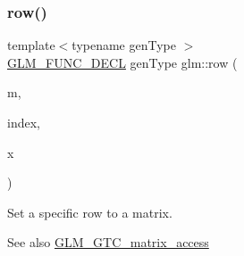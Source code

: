 \subsubsection{\texorpdfstring{row()}{row()}\hspace{0.1cm}{\footnotesize\ttfamily [2/2]}}
{\footnotesize\ttfamily template$<$typename gen\+Type $>$ \\
\hyperlink{setup_8hpp_ab2d052de21a70539923e9bcbf6e83a51}{G\+L\+M\+\_\+\+F\+U\+N\+C\+\_\+\+D\+E\+CL} gen\+Type glm\+::row (\begin{DoxyParamCaption}\item[{gen\+Type const \&}]{m,  }\item[{\hyperlink{namespaceglm_a090a0de2260835bee80e71a702492ed9}{length\+\_\+t}}]{index,  }\item[{typename gen\+Type\+::row\+\_\+type const \&}]{x }\end{DoxyParamCaption})}

Set a specific row to a matrix. \begin{DoxySeeAlso}{See also}
\hyperlink{group__gtc__matrix__access}{G\+L\+M\+\_\+\+G\+T\+C\+\_\+matrix\+\_\+access} 
\end{DoxySeeAlso}
